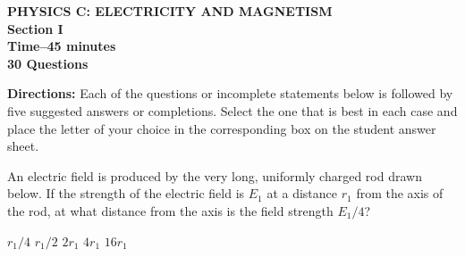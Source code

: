 \documentclass[12pt]{../../../oss-classkick-exam}
\begin{document}
\begin{center}
  \textbf{PHYSICS C: ELECTRICITY AND MAGNETISM\\
    Section I\\
    Time--45 minutes\\
    30 Questions
  }
\end{center}

\textbf{Directions:} Each of the questions or incomplete statements below is
followed by five suggested answers or completions. Select the one that is best
in each case and place the letter of your choice in the corresponding box on
the student answer sheet.

\begin{questions}
%
  
  \question An electric field is produced by the very long, uniformly charged
  rod drawn below. If the strength of the electric field is $E_1$ at a distance
  $r_1$ from the axis of the rod, at what distance from the axis is
  the field strength $E_1/4$?

  \vspace{.1in}
  \begin{minipage}{.35\linewidth}
  \end{minipage}
  \begin{minipage}{.4\linewidth}
    \begin{choices}
      \choice $r_1/4$
      \choice $r_1/2$
      \choice $2r_1$
      \choice $4r_1$
      \choice $16r_1$
    \end{choices}
  \end{minipage}
  


\end{questions}
\end{document}

